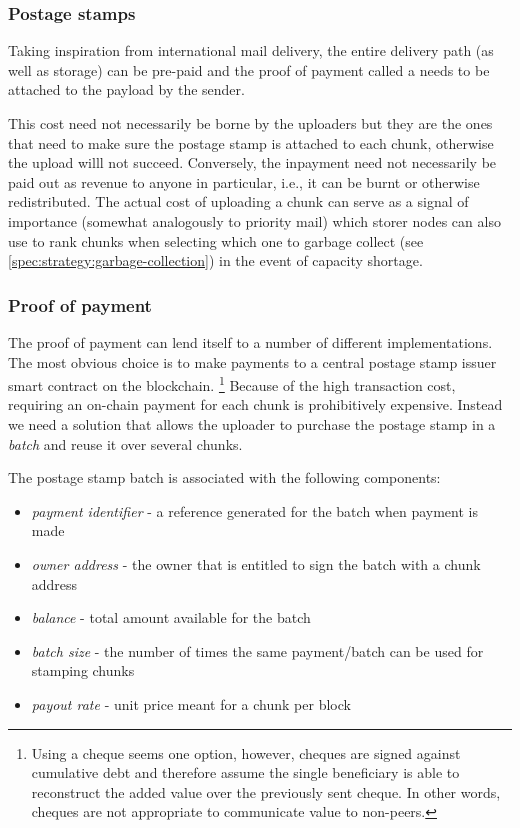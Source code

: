 \subsubsection{Postage stamps}

Taking inspiration from international mail delivery, the entire delivery path (as well as storage) can be pre-paid and the proof of payment called a  needs to be attached to the payload by the sender.

This cost need not necessarily be borne by the uploaders but they are the ones that need to make sure the postage stamp is attached to each chunk,  otherwise the upload willl not succeed. Conversely,  the inpayment need not necessarily be paid out as revenue to anyone in particular, i.e., it can be burnt or otherwise redistributed. The actual cost of uploading a chunk can serve as a signal of importance (somewhat analogously to priority mail) which storer nodes can also use to rank chunks when selecting which one to garbage collect (see \ref{spec:strategy:garbage-collection}) in the event of capacity shortage.



\subsubsection{Proof of payment}

The proof of payment can lend itself to a number of different implementations. The most obvious choice is to make payments to a central postage stamp issuer smart contract on the blockchain.%
%
\footnote{Using a cheque seems one option, however, cheques are  signed against cumulative debt and therefore assume the single beneficiary is able to reconstruct the added value over the previously sent cheque. In other words, cheques are not appropriate to communicate value to non-peers.}
%
Because of the high transaction cost, requiring an on-chain payment for each chunk is prohibitively expensive. Instead we need a solution that allows the uploader to purchase the postage stamp in a \emph{batch} and reuse it over several chunks. 

The postage stamp batch is associated with the following components:

\begin{itemize}
\item \emph{payment identifier} - a reference generated for  the batch when payment is made
\item \emph{owner address} - the owner that is entitled to sign the batch with a chunk address
\item \emph{balance} - total amount available for the batch
\item \emph{batch size} - the number of times the same payment/batch can be used for stamping chunks
\item \emph{payout rate} - unit price meant for a chunk per block 
\end{itemize}


